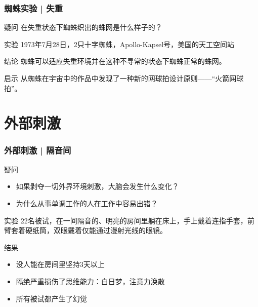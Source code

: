 \begin{frame}
  \frametitle{蜘蛛实验 | 失重}
  \begin{block}{疑问}
    在失重状态下蜘蛛织出的蛛网是什么样子的？
  \end{block}
  \pause
  \begin{block}{实验}
    1973年7月28日，2只十字蜘蛛，Apollo-Kapsel号，美国的天工空间站
  \end{block}
  \pause
  \begin{block}{结论}
    蜘蛛可以适应失重环境并在这种不寻常的状态下蜘蛛正常的蛛网。
  \end{block}
  \pause
  \begin{block}{启示}
   从蜘蛛在宇宙中的作品中发现了一种新的网球拍设计原则——“火箭网球拍”。
  \end{block}
\end{frame}

\section{外部刺激}
\begin{frame}
  \frametitle{外部刺激 | 隔音间}
  \begin{block}{疑问}
    \begin{itemize}
      \item 如果剥夺一切外界环境刺激，大脑会发生什么变化？
      \item 为什么从事单调工作的人在工作中容易出错？
    \end{itemize}
  \end{block}
  \pause
  \begin{block}{实验}
22名被试，在一间隔音的、明亮的房间里躺在床上，手上戴着连指手套，前臂套着硬纸筒，双眼戴着仅能通过漫射光线的眼镜。
  \end{block}
  \pause
  \begin{block}{结果}
    \begin{itemize}
      \item 没人能在房间里坚持3天以上
      \item 隔绝严重损伤了思维能力：白日梦，注意力涣散
      \item 所有被试都产生了幻觉
    \end{itemize}
  \end{block}
\end{frame}

